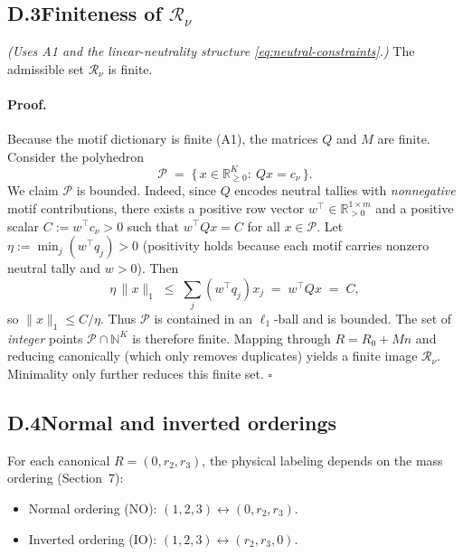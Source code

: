 \documentclass[11pt]{article}
\begin{document}
\subsection*{D.3\quad Finiteness of $\mathcal{R}_\nu$}

\begin{theorem}\label{thm:finite}
\emph{(Uses A1 and the linear-neutrality structure \eqref{eq:neutral-constraints}.)}
The admissible set $\mathcal{R}_\nu$ is finite.
\end{theorem}

\paragraph{Proof.}
Because the motif dictionary is finite (A1), the matrices $Q$ and $M$ are finite. Consider the polyhedron
\[
\mathcal{P}\;=\;\{\,x\in\mathbb{R}_{\ge 0}^K:\ Qx=c_\nu\,\}.
\]
We claim $\mathcal{P}$ is bounded. Indeed, since $Q$ encodes neutral tallies with \emph{nonnegative} motif contributions, there exists a positive row vector $w^\top\in\mathbb{R}_{>0}^{1\times m}$ and a positive scalar $C:=w^\top c_\nu>0$ such that $w^\top Qx=C$ for all $x\in\mathcal{P}$. Let $\eta:=\min_{j}(w^\top q_j)>0$ (positivity holds because each motif carries nonzero neutral tally and $w>0$). Then
\[
\eta\,\|x\|_1 \;\le\; \sum_j (w^\top q_j) x_j \;=\;w^\top Qx \;=\; C,
\]
so $\|x\|_1\le C/\eta$. Thus $\mathcal{P}$ is contained in an $\ell_1$-ball and is bounded. The set of \emph{integer} points $\mathcal{P}\cap\mathbb{N}^K$ is therefore finite. Mapping through $R=R_0+Mn$ and reducing canonically (which only removes duplicates) yields a finite image $\mathcal{R}_\nu$. Minimality only further reduces this finite set. \hfill$\square$

\subsection*{D.4\quad Normal and inverted orderings}

For each canonical $R=(0,r_2,r_3)$, the physical labeling depends on the mass ordering (Section~7):

\begin{itemize}
  \item Normal ordering (NO): $(1,2,3)\leftrightarrow (0,r_2,r_3)$.
  \item Inverted ordering (IO): $(1,2,3)\leftrightarrow (r_2,r_3,0)$.
\end{itemize}
\end{document}
